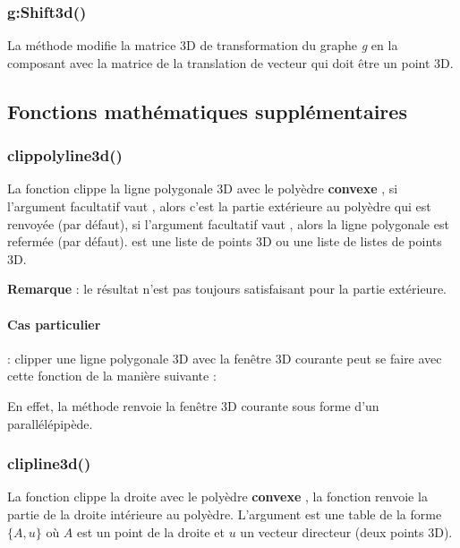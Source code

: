 \subsubsection{g:Shift3d()}

La méthode  modifie la matrice 3D de transformation du graphe \emph g en la composant avec la matrice de la translation de vecteur  qui doit être un point 3D.

\subsection{Fonctions mathématiques supplémentaires}

\subsubsection{clippolyline3d()}

La fonction  clippe la ligne polygonale 3D  avec le polyèdre \textbf{convexe} , si l'argument facultatif  vaut \true, alors c'est la partie extérieure au polyèdre qui est renvoyée (\false par défaut), si l'argument facultatif  vaut \true, alors la ligne polygonale est refermée (\false par défaut).  est une liste de points 3D ou une liste de listes de points 3D.

\textbf{Remarque} : le résultat n'est pas toujours satisfaisant pour la partie extérieure.

\paragraph{Cas particulier} : clipper une ligne polygonale 3D  avec la fenêtre 3D courante peut se faire avec cette fonction de la manière suivante :

En effet, la méthode  renvoie la fenêtre 3D courante sous forme d'un parallélépipède.


\subsubsection{clipline3d()}

La fonction  clippe la droite  avec le polyèdre \textbf{convexe} , la fonction renvoie la partie de la droite intérieure au polyèdre. L'argument  est une table de la forme $\{A,u\}$ où $A$ est un point de la droite et $u$ un vecteur directeur (deux points 3D).


